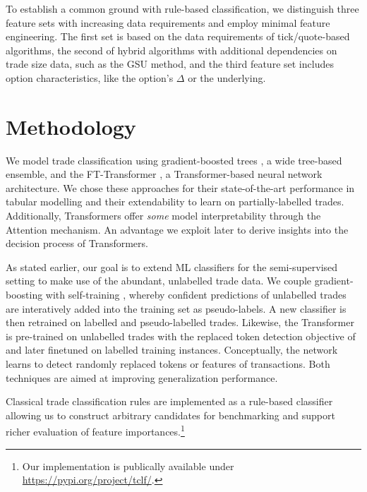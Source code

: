 To establish a common ground with rule-based classification, we distinguish three feature sets with increasing data requirements and employ minimal feature engineering. The first set is based on the data requirements of tick/quote-based algorithms, the second of hybrid algorithms with additional dependencies on trade size data, such as the \gls{GSU} method, and the third feature set includes option characteristics, like the option's $\Delta$ or the underlying. 

\section{Methodology}

We model trade classification using gradient-boosted trees \autocites[][]{friedmanGreedyFunctionApproximation2001}, a wide tree-based ensemble, and the FT-Transformer \autocite{gorishniyRevisitingDeepLearning2021}, a Transformer-based neural network architecture. We chose these approaches for their state-of-the-art performance in tabular modelling \autocites[][]{gorishniyRevisitingDeepLearning2021}[][]{grinsztajnWhyTreebasedModels2022} and their extendability to learn on partially-labelled trades. Additionally, Transformers offer \textit{some} model interpretability through the Attention mechanism. An advantage we exploit later to derive insights into the decision process of Transformers.

As stated earlier, our goal is to extend \gls{ML} classifiers for the semi-supervised setting to make use of the abundant, unlabelled trade data. We couple gradient-boosting with self-training \autocite{yarowskyUnsupervisedWordSense1995}, whereby confident predictions of unlabelled trades are interatively added into the training set as pseudo-labels. A new classifier is then retrained on labelled and pseudo-labelled trades. Likewise, the Transformer is pre-trained on unlabelled trades with the replaced token detection objective of \textcite{clarkElectraPretrainingText2020} and later finetuned on labelled training instances. Conceptually, the network learns to detect randomly replaced tokens or features of transactions. Both techniques are aimed at improving generalization performance.

Classical trade classification rules are implemented as a rule-based classifier allowing us to construct arbitrary candidates for benchmarking and support richer evaluation of feature importances.\footnote{Our implementation is publically available under \url{https://pypi.org/project/tclf/}.}

